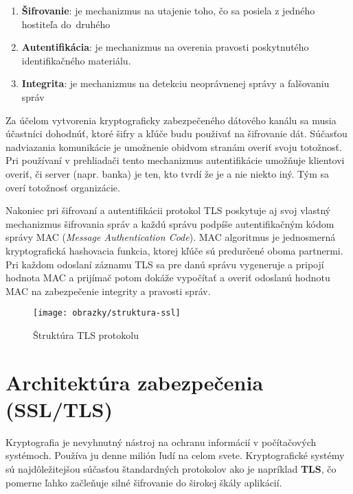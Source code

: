 \begin{enumerate}

\item \textbf{Šifrovanie}: je mechanizmus na utajenie toho, čo sa posiela z jedného hostiteľa do~druhého

\item \textbf{Autentifikácia}: je mechanizmus na overenia pravosti poskytnutého identifikačného materiálu.

\item \textbf{Integrita}: je mechanizmus na detekciu neoprávnenej správy a falšovaniu správ

\end{enumerate}

Za účelom vytvorenia kryptograficky zabezpečeného dátového kanálu sa musia účastníci  dohodnúť, ktoré šifry a kľúče budu použivať na šifrovanie dát. Súčasťou nadviazania komunikácie je umožnenie obidvom stranám overiť svoju totožnosť. Pri používaní v pre\-hlia\-da\-či tento mechanizmus autentifikácie umožňuje klientovi overiť, či server (napr. banka) je ten, kto tvrdí že je a nie niekto iný. Tým sa overí totožnosť organizácie.

Nakoniec pri šifrovaní a autentifikácii protokol TLS poskytuje aj svoj vlastný mechanizmus šifrovania správ a každú správu podpíše autentifikačným kódom správy MAC (\emph{Message Authentication Code}). MAC algoritmus je jednosmerná kryptografická hashovacia funkcia, ktorej kľúče sú predurčené oboma partnermi. Pri každom odoslaní záznamu TLS sa pre danú správu vygeneruje a pripojí hodnota MAC a prijímač potom dokáže vypočítať a overiť odoslanú hodnotu MAC na zabezpečenie integrity a pravosti správ. \cite{tls-protokol}

\begin{figure}[!h]
    \centering
    \vspace{1cm}
    \texttt{[image: obrazky/struktura-ssl]}
    \caption{Štruktúra TLS protokolu}
    \label{struktura-ssl}
\end{figure}

\section{Architektúra zabezpečenia (SSL/TLS)}
Kryptografia je nevyhnutný nástroj na ochranu informácií v počítačových systémoch. Po\-u\-ží\-va ju denne milión ľudí na celom svete. Kryptografické systémy sú najdôležitejšou súčasťou štandardných protokolov ako je napríklad \textbf{TLS}, čo pomerne ľahko začleňuje silné šifrovanie do širokej škály aplikácií.

